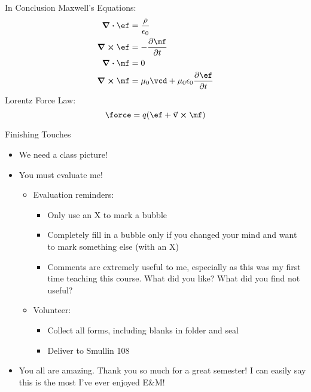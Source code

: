 \documentclass[pdf,aspectratio=169]{beamer}
\begin{document}
\begin{frame}{In Conclusion}
	Maxwell's Equations:
	\begin{align*}
		\div\ef &= \frac{\rho}{\epsilon_0} \\
		\curl\ef &= - \pdv{\mf}{t} \\
		\div\mf &= 0 \\
		\curl\mf &= \mu_0 \vcd + \mu_0\epsilon_0 \pdv{\ef}{t}
	\end{align*}
	Lorentz Force Law:
	\[\force = q(\ef + \va{v}\cp \mf)\]
\end{frame}

\begin{frame}{Finishing Touches}
	\begin{itemize}
		\item<1-> We need a class picture!
		\item<2-> You must evaluate me!
			\begin{itemize}
				\item Evaluation reminders:
					\begin{itemize}
						\item Only use an X to mark a bubble
						\item Completely fill in a bubble only if you changed your mind and want to mark something else (with an X)
						\item Comments are extremely useful to me, especially as this was my first time teaching this course. What did you like? What did you find not useful?
					\end{itemize}
				\item Volunteer:
					\begin{itemize}
						\item Collect all forms, including blanks in folder and seal
						\item Deliver to Smullin 108
					\end{itemize}
			\end{itemize}
		\item<3-> You all are amazing. Thank you so much for a great semester! I can easily say this is the most I've ever enjoyed E\&M!
	\end{itemize}
\end{frame}
\end{document}
